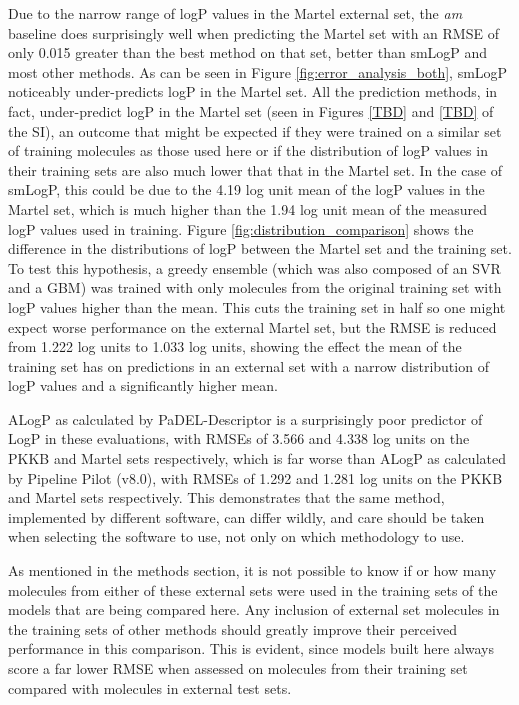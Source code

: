 \documentclass[10pt]{bmc_article}
\newenvironment{bmcformat}{\begin{raggedright}\baselineskip20pt\sloppy\setboolean{publ}{false}}{\end{raggedright}\baselineskip20pt\sloppy}
\begin{document}
\begin{bmcformat}
Due to the narrow range of logP values in the Martel external set, the \textit{am} baseline does surprisingly well when predicting the Martel set with an RMSE of only 0.015 greater than the best method on that set, better than smLogP and most other methods. As can be seen in Figure \ref{fig:error_analysis_both}, smLogP noticeably under-predicts logP in the Martel set. All the prediction methods, in fact, under-predict logP in the Martel set (seen in Figures \ref{TBD} and \ref{TBD} of the SI), an outcome that might be expected if they were trained on a similar set of training molecules as those used here or if the distribution of logP values in their training sets are also much lower that that in the Martel set. In the case of smLogP, this could be due to the 4.19 log unit mean of the logP values in the Martel set, which is much higher than the 1.94 log unit mean of the measured logP values used in training. Figure \ref{fig:distribution_comparison} shows the difference in the distributions of logP between the Martel set and the training set. To test this hypothesis, a greedy ensemble (which was also composed of an SVR and a GBM) was trained with only molecules from the original training set with logP values higher than the mean. This cuts the training set in half so one might expect worse performance on the external Martel set, but the RMSE is reduced from 1.222 log units to 1.033 log units, showing the effect the mean of the training set has on predictions in an external set with a narrow distribution of logP values and a significantly higher mean. 

ALogP as calculated by PaDEL-Descriptor is a surprisingly poor predictor of LogP in these evaluations, with RMSEs of 3.566 and 4.338 log units on the PKKB and Martel sets respectively, which is far worse than ALogP as calculated by Pipeline Pilot (v8.0), with RMSEs of 1.292 and 1.281 log units on the PKKB and Martel sets respectively. This demonstrates that the same method, implemented by different software, can differ wildly, and care should be taken when selecting the software to use, not only on which methodology to use.

As mentioned in the methods section, it is not possible to know if or how many molecules from either of these external sets were used in the training sets of the models that are being compared here. Any inclusion of external set molecules in the training sets of other methods should greatly improve their perceived performance in this comparison. This is evident, since models built here always score a far lower RMSE when assessed on molecules from their training set compared with molecules in external test sets.


\end{bmcformat}
\end{document}

